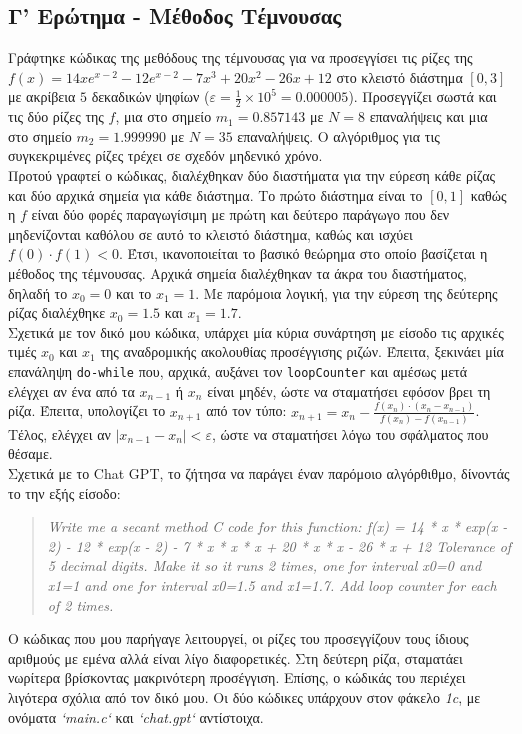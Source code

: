 \documentclass[a4paper, 14pt]{article}   %
\begin{document}
\vspace{2\baselineskip}

\subsection*{Γ' Ερώτημα - Μέθοδος Τέμνουσας}  %

Γράφτηκε κώδικας της μεθόδους της τέμνουσας για να προσεγγίσει τις ρίζες της \(f(x) = 14xe^{x-2} - 12e^{x-2} - 7x^3 + 20x^2 - 26x + 12\) στο κλειστό διάστημα \([0,3]\) με ακρίβεια $5$ δεκαδικών ψηφίων (\(\varepsilon = \frac{1}{2} \times 10^5 = 0.000005\)). Προσεγγίζει σωστά και τις δύο ρίζες της \(f\), μια στο σημείο \(m_1 = 0.857143\) με \(N = 8\) επαναλήψεις και μια στο σημείο \(m_2 = 1.999990\) με \(N = 35\) επαναλήψεις. Ο αλγόριθμος για τις συγκεκριμένες ρίζες τρέχει σε σχεδόν μηδενικό χρόνο.\\

Προτού γραφτεί ο κώδικας, διαλέχθηκαν δύο διαστήματα για την εύρεση κάθε ρίζας και δύο αρχικά σημεία για κάθε διάστημα. Το πρώτο διάστημα είναι το \([0,1]\) καθώς η \(f\) είναι δύο φορές παραγωγίσιμη με πρώτη και δεύτερο παράγωγο που δεν μηδενίζονται καθόλου σε αυτό το κλειστό διάστημα, καθώς και ισχύει \(f(0) \cdot f(1)<0\). Έτσι, ικανοποιείται το βασικό θεώρημα στο οποίο βασίζεται η μέθοδος της τέμνουσας. Αρχικά σημεία διαλέχθηκαν τα άκρα του διαστήματος, δηλαδή το \(x_0=0\) και το \(x_1=1\). Με παρόμοια λογική, για την εύρεση της δεύτερης ρίζας διαλέχθηκε \(x_0=1.5\) και \(x_1=1.7\). \\

Σχετικά με τον δικό μου κώδικα, υπάρχει μία κύρια συνάρτηση με είσοδο τις αρχικές τιμές \(x_0\) και \(x_1\) της αναδρομικής ακολουθίας προσέγγισης ριζών. Έπειτα, ξεκινάει μία επανάληψη \texttt{do-while} που, αρχικά, αυξάνει τον \texttt{loopCounter} και αμέσως μετά ελέγχει αν ένα από τα \(x_{n-1}\) ή \(x_n\) είναι μηδέν, ώστε να σταματήσει εφόσον βρει τη ρίζα. Έπειτα, υπολογίζει το \(x_{n+1}\) από τον τύπο: \(x_{n+1} = x_n - \frac{f(x_n) \cdot (x_n - x_{n-1})}{f(x_n) - f(x_{n-1})}\). Τέλος, ελέγχει αν \(|x_{n-1} - x_n| < \varepsilon\), ώστε να σταματήσει λόγω του σφάλματος που θέσαμε.\\

Σχετικά με το Chat GPT, το ζήτησα να παράγει έναν παρόμοιο αλγόρθιθμο, δίνοντάς το την εξής είσοδο:
	\begin{quote}
	{\small \emph{Write me a secant method C code for this function: f(x) = 14 * x * exp(x - 2) - 12 * exp(x - 2) - 7 * x * x * x + 20 * x * x - 26 * x + 12
Tolerance of 5 decimal digits.
Make it so it runs 2 times, one for interval x0=0 and x1=1 and one for interval x0=1.5 and x1=1.7. Add loop counter for each of 2 times.}}
	\end{quote}
Ο κώδικας που μου παρήγαγε λειτουργεί, οι ρίζες του προσεγγίζουν τους ίδιους αριθμούς με εμένα αλλά είναι λίγο διαφορετικές. Στη δεύτερη ρίζα, σταματάει νωρίτερα βρίσκοντας μακρινότερη προσέγγιση. Επίσης, ο κώδικάς του περιέχει λιγότερα σχόλια από τον δικό μου. Οι δύο κώδικες υπάρχουν στον φάκελο \emph{1c}, με ονόματα \emph{`main.c`} και \emph{`chat.gpt`} αντίστοιχα.\\
\end{document}
